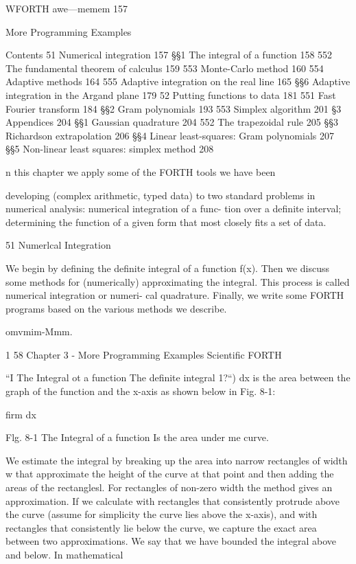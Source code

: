 WFORTH awe—memem 157

More Programming Examples

Contents
51 Numerical integration 157
§§1 The integral of a function 158
552 The fundamental theorem of calculus 159
553 Monte-Carlo method 160
554 Adaptive methods 164
555 Adaptive integration on the real line 165
§§6 Adaptive integration in the Argand plane 179
52 Putting functions to data 181
551 Fast Fourier transform 184
§§2 Gram polynomials 193
553 Simplex algorithm 201
§3 Appendices 204
§§1 Gaussian quadrature 204
552 The trapezoidal rule 205
§§3 Richardson extrapolation 206
§§4 Linear least-squares: Gram polynomials 207
§§5 Non-linear least squares: simplex method 208

n this chapter we apply some of the FORTH tools we have been

developing (complex arithmetic, typed data) to two standard
problems in numerical analysis: numerical integration of a func-
tion over a deﬁnite interval; determining the function of a given
form that most closely fits a set of data.

51 Numerlcal Integration

We begin by deﬁning the deﬁnite integral of a function f(x). Then
we discuss some methods for (numerically) approximating the
integral. This process is called numerical integration or numeri-
cal quadrature. Finally, we write some FORTH programs based
on the various methods we describe.

omvmim-Mmm.

1 58 Chapter 3 - More Programming Examples Scientiﬁc FORTH

“I The Integral ot a function
The deﬁnite integral 1?“) dx is the area between the graph of
the function and the x-axis as shown below in Fig. 8-1:

 

 

 

ﬁrm dx

 

 

 

 

 

 

 

Flg. 8-1 The Integral of a function Is the area under me curve.

We estimate the integral by breaking up the area into narrow
rectangles of width w that approximate the height of the curve at
that point and then adding the areas of the rectanglesl. For
rectangles of non-zero width the method gives an approximation.
If we calculate with rectangles that consistently protrude above
the curve (assume for simplicity the curve lies above the x-axis),
and with rectangles that consistently lie below the curve, we
capture the exact area between two approximations. We say that
we have bounded the integral above and below. In mathematical

